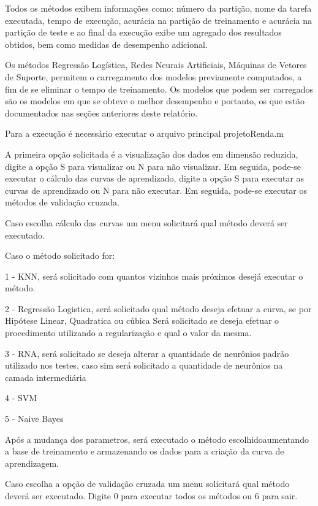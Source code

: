 
Todos os métodos exibem informações como: número da partição, nome da tarefa executada, tempo de execução, acurácia na partição de treinamento e acurácia na partição de teste e ao final da execução exibe um agregado dos resultados obtidos, bem como medidas de desempenho adicional.

Os métodos Regressão Logística, Redes Neurais Artificiais, Máquinas de Vetores de Suporte, permitem o carregamento dos modelos previamente computados, a fim de se eliminar o tempo de treinamento. Os modelos que podem ser carregados são os modelos em que se obteve o melhor desempenho e portanto, os que estão documentados nas seções anteriores deste relatório.

Para a execução é necessário executar o arquivo principal projetoRenda.m

A primeira opção solicitada é a visualização dos dados em dimensão reduzida, digite a opção S para visualizar ou N para não visualizar. Em seguida, pode-se executar o cálculo das curvas de aprendizado, digite a opção S para executar as curvas de aprendizado ou N para não executar. Em seguida, pode-se executar os métodos de validação cruzada.

Caso escolha cálculo das curvas um menu solicitará qual método deverá ser executado.

Caso o método solicitado for:

1 - KNN, será solicitado com quantos vizinhos mais próximos desejá executar o método.

2 - Regressão Logistica, será solicitado qual método deseja efetuar a curva, se por Hipótese Linear, Quadratica ou cúbica
Será solicitado se deseja efetuar o procedimento utilizando a regularização e qual o valor da mesma.

3 - RNA, será solicitado se deseja alterar a quantidade de neurônios padrão utilizado nos testes, caso sim será solicitado a quantidade de neurônios na camada intermediária

4 - SVM

5 - Naive Bayes

Após a mudança dos parametros, será executado o método escolhidoaumentando a base de treinamento e armazenando os dados para a criação da curva de aprendizagem.

Caso escolha a opção de validação cruzada um menu solicitará qual método deverá ser executado. Digite 0 para executar todos os métodos ou 6 para sair.

